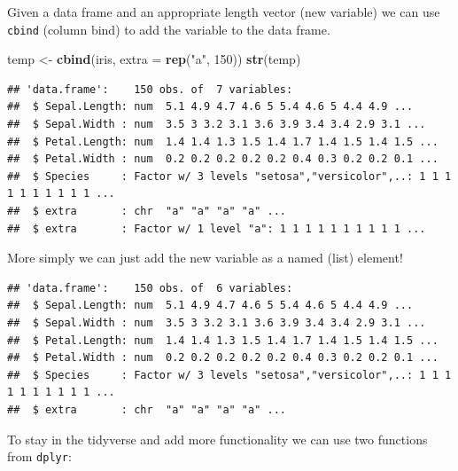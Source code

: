 \documentclass[
]{book}
\newenvironment{Shaded}{\begin{snugshade}}{\end{snugshade}}
\newcommand{\DataTypeTok}[1]{\textcolor[rgb]{0.13,0.29,0.53}{#1}}
\newcommand{\DecValTok}[1]{\textcolor[rgb]{0.00,0.00,0.81}{#1}}
\newcommand{\KeywordTok}[1]{\textcolor[rgb]{0.13,0.29,0.53}{\textbf{#1}}}
\newcommand{\NormalTok}[1]{#1}
\newcommand{\OperatorTok}[1]{\textcolor[rgb]{0.81,0.36,0.00}{\textbf{#1}}}
\newcommand{\StringTok}[1]{\textcolor[rgb]{0.31,0.60,0.02}{#1}}
\theoremstyle{definition}
\theoremstyle{definition}
\theoremstyle{definition}
\theoremstyle{remark}
\begin{document}
Given a data frame and an appropriate length vector (new variable) we can use \texttt{cbind} (column bind) to add the variable to the data frame.

\begin{Shaded}
\begin{Highlighting}[]
\NormalTok{temp <-}\StringTok{ }\KeywordTok{cbind}\NormalTok{(iris, }\DataTypeTok{extra =} \KeywordTok{rep}\NormalTok{(}\StringTok{"a"}\NormalTok{, }\DecValTok{150}\NormalTok{))}
\KeywordTok{str}\NormalTok{(temp)}
\end{Highlighting}
\end{Shaded}

\begin{verbatim}
## 'data.frame':    150 obs. of  7 variables:
##  $ Sepal.Length: num  5.1 4.9 4.7 4.6 5 5.4 4.6 5 4.4 4.9 ...
##  $ Sepal.Width : num  3.5 3 3.2 3.1 3.6 3.9 3.4 3.4 2.9 3.1 ...
##  $ Petal.Length: num  1.4 1.4 1.3 1.5 1.4 1.7 1.4 1.5 1.4 1.5 ...
##  $ Petal.Width : num  0.2 0.2 0.2 0.2 0.2 0.4 0.3 0.2 0.2 0.1 ...
##  $ Species     : Factor w/ 3 levels "setosa","versicolor",..: 1 1 1 1 1 1 1 1 1 1 ...
##  $ extra       : chr  "a" "a" "a" "a" ...
##  $ extra       : Factor w/ 1 level "a": 1 1 1 1 1 1 1 1 1 1 ...
\end{verbatim}

More simply we can just add the new variable as a named (list) element!

\begin{Shaded}
\end{Shaded}

\begin{verbatim}
## 'data.frame':    150 obs. of  6 variables:
##  $ Sepal.Length: num  5.1 4.9 4.7 4.6 5 5.4 4.6 5 4.4 4.9 ...
##  $ Sepal.Width : num  3.5 3 3.2 3.1 3.6 3.9 3.4 3.4 2.9 3.1 ...
##  $ Petal.Length: num  1.4 1.4 1.3 1.5 1.4 1.7 1.4 1.5 1.4 1.5 ...
##  $ Petal.Width : num  0.2 0.2 0.2 0.2 0.2 0.4 0.3 0.2 0.2 0.1 ...
##  $ Species     : Factor w/ 3 levels "setosa","versicolor",..: 1 1 1 1 1 1 1 1 1 1 ...
##  $ extra       : chr  "a" "a" "a" "a" ...
\end{verbatim}

To stay in the tidyverse and add more functionality we can use two functions from \texttt{dplyr}:
\end{document}
